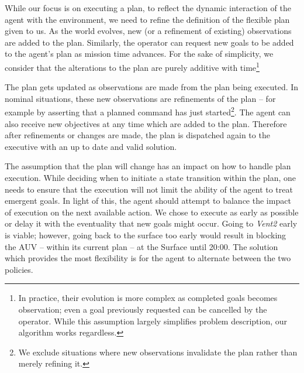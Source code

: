 While our focus is on executing a plan, to reflect the dynamic
interaction of the agent with the environment, we need to refine the
definition of the flexible plan given to us. As the world evolves, new
(or a refinement of existing) observations are added to the
plan. Similarly, the operator can request new goals to be added to the
agent's plan as mission time advances. For the sake of simplicity, we
consider that the alterations to the plan are purely additive with
time\footnote{In practice, their evolution is more complex as
  completed goals becomes observation; even a goal previously
  requested can be cancelled by the operator. While this assumption
  largely simplifies problem description, our algorithm works
  regardless.}
%

The plan gets
updated as observations are made from the plan being executed. In
nominal situations, these new observations are refinements of the plan
-- for example by asserting that a planned command has just
started\footnote{We exclude situations where new observations
  invalidate the plan rather than merely refining it.}. The agent can
also receive new objectives at any time which are added to the
plan. Therefore after refinements or changes are made, the plan is
dispatched again to the executive with an up to date and valid
solution.

The assumption that the plan will change has an impact on how to
handle plan execution. While deciding when to initiate a state
transition within the plan, one needs to ensure that the execution
will not limit the ability of the agent to treat emergent goals. In
light of this, the agent should attempt to balance the impact of
execution on the next available action. We chose to execute as early
as possible or delay it with the eventuality that new goals might
occur. Going to \emph{Vent2} early is viable; however, going back to
the surface too early would result in blocking the AUV -- within its
current plan -- at the Surface until 20:00. The solution which
provides the most flexibility is for the agent to alternate between
the two policies.

